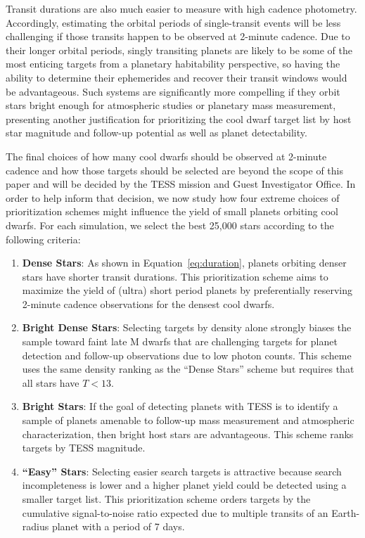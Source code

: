 \documentclass[twocolumn]{aastex62}
\begin{document}
Transit durations are also much easier to measure with high cadence photometry. Accordingly, estimating the orbital periods of single-transit events will be less challenging if those transits happen to be observed at 2-minute cadence. Due to their longer orbital periods,  singly transiting planets are likely to be some of the most enticing targets from a planetary habitability perspective, so having the ability to determine their ephemerides and recover their transit windows would be advantageous. Such systems are significantly more compelling if they orbit stars bright enough for atmospheric studies or planetary mass measurement, presenting another justification for prioritizing the cool dwarf target list by host star magnitude and follow-up potential as well as planet detectability.

The final choices of how many cool dwarfs should be observed at 2-minute cadence and how those targets should be selected are beyond the scope of this paper and will be decided by the TESS mission and Guest Investigator Office. In order to help inform that decision, we now study how four extreme choices of prioritization schemes might influence the yield of small planets orbiting cool dwarfs. For each simulation, we select the best 25,000 stars according to the following criteria:   
\begin{enumerate}
    \item \textbf{Dense Stars}: As shown in Equation~\ref{eq:duration}, planets orbiting denser stars have shorter transit durations. This prioritization scheme aims to maximize the yield of (ultra) short period planets by preferentially reserving 2-minute cadence observations for the densest cool dwarfs.
    \item \textbf{Bright Dense Stars}: Selecting targets by density alone strongly biases the sample toward faint late M dwarfs that are challenging targets for planet detection and follow-up observations due to low photon counts. This scheme uses the same density ranking as the ``Dense Stars'' scheme but requires that all stars have $T < 13$.
    \item \textbf{Bright Stars}: If the goal of detecting planets with TESS is to identify a sample of planets amenable to follow-up mass measurement and atmospheric characterization, then bright host stars are advantageous. This scheme ranks targets by TESS magnitude. 
    \item \textbf{``Easy'' Stars}: Selecting easier search targets is attractive because search incompleteness is lower and a higher planet yield could be detected using a smaller target list.  This prioritization scheme orders targets by the cumulative signal-to-noise ratio expected due to multiple transits of an Earth-radius planet with a period of 7 days. 
\end{enumerate}
\end{document}
